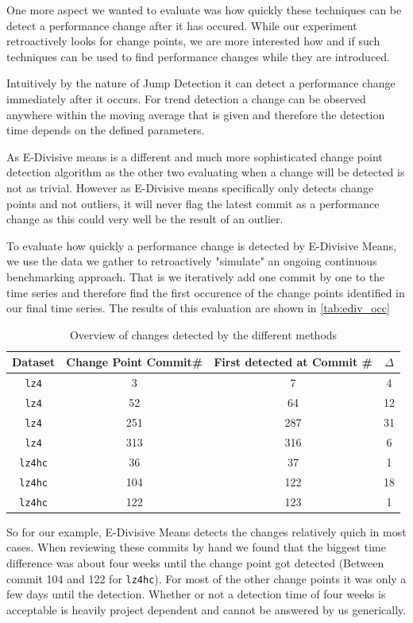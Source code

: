 \documentclass[	runningheads,
				a4paper]{llncs}
\begin{document}
One more aspect we wanted to evaluate was how quickly these techniques can be detect a performance change after it has occured. While our experiment retroactively looks for change points, we are more interested how and if such techniques can be used to find performance changes while they are introduced.

Intuitively by the nature of Jump Detection it can detect a performance change immediately after it occurs. For trend detection a change can be observed anywhere within the moving average that is given and therefore the detection time depends on the defined parameters.

As E-Divisive means is a different and much more sophisticated change point detection algorithm as the other two evaluating when a change will be detected is not as trivial. However as E-Divisive means specifically only detects change points and not outliers, it will never flag the latest commit as a performance change as this could very well be the result of an outlier.

To evaluate how quickly a performance change is detected by E-Divisive Means, we use the data we gather to retroactively "simulate" an ongoing continuous benchmarking approach. That is we iteratively add one commit by one to the time series and therefore find the first occurence of the change points identified in our final time series. The results of this evaluation are shown in \autoref{tab:ediv_occ}

\begin{table}
	\centering
	\begin{tabular}{|c||c|c|c|}
		\hline
		\textbf{Dataset}&\textbf{Change Point Commit\#}&\textbf{First detected at Commit \#}&\textbf{$\Delta$}
		\\\hline\hline
		\texttt{lz4}&3&7&4
		\\\hline
		\texttt{lz4}&52&64&12
		\\\hline
		\texttt{lz4}&251&287&31
		\\\hline
		\texttt{lz4}&313&316&6
		\\\hline
		\texttt{lz4hc}&36&37&1
		\\\hline
		\texttt{lz4hc}&104&122&18
		\\\hline
		\texttt{lz4hc}&122&123&1
		\\\hline
	\end{tabular}
	\caption{Overview of changes detected by the different methods}
	\label{tab:ediv_occ}
\end{table}

So for our example, E-Divisive Means detects the changes relatively quich in most cases. When reviewing these commits by hand we found that the biggest time difference was about four weeks until the change point got detected (Between commit 104 and 122 for \texttt{lz4hc}). For most of the other change points it was only a few days until the detection. Whether or not a detection time of four weeks is acceptable is heavily project dependent and cannot be answered by us generically.
\end{document}
